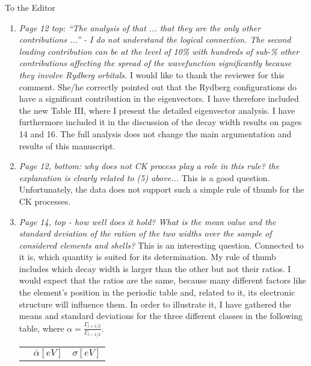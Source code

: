 \documentclass[DIN,pagenumber=false,parskip=half,fromalign=left,fromphone=false,fromemail=true,fromurl=false,fromlogo=false,fromrule=false]{scrlttr2}
\begin{document}
\begin{letter}{To the Editor}
\begin{enumerate}
 \item \emph{Page 12 top: ``The analysis of that ... that they are the only other
             contributions ...'' - I do not understand the logical connection.
             The second leading contribution can be at the level of 10\% with
             hundreds of sub-\% other contributions affecting the spread of the
             wavefunction significantly because they involve Rydberg orbitals. }
             \newline
             I would like to thank the reviewer for this comment. She/he
             correctly pointed out that the Rydberg configurations do have a
             significant contribution in the eigenvectors. I have therefore
             included the new Table III, where I present the detailed
             eigenvector analysis. I have furthermore included it in the
             discussion of the decay width results on pages 14 and 16.
             The full analysis does
             not change the main argumentation and results of this manuscript.
 \item \emph{Page 12, bottom: why does not CK process play a role in this rule?
             the explanation is clearly related to (5) above... } \newline
             This is a good question. Unfortunately, the data does
             not support such a simple rule of thumb
             for the CK processes.
 \item \emph{Page 14, top - how well does it hold? What is the mean value and the
             standard deviation of the ration of the two widths over the sample of
             considered elements and shells?} \newline
             This is an interesting question. Connected to it is, which quantity
             is suited for its determination. My rule of thumb includes which
             decay width is larger than the other but not their ratios. I would
             expect that the ratios are the same, because
             many different factors like the element's
             position in the periodic table and, related to it, its electronic 
             structure will influence them. In order to illustrate it,
             I have gathered the means and standard deviations for the three
             different classes in the following table, where
             $\alpha = \frac{\Gamma_{l+1/2}}{\Gamma_{l-1/2}}$.
\begin{center}
\begin{tabular}{lrr}
\toprule
     & $\overline{\alpha} [\unit{eV}]$ & $\sigma [\unit{eV}]$ \\

\end{tabular}
\end{center}
\end{enumerate}
\end{letter}
\end{document}
